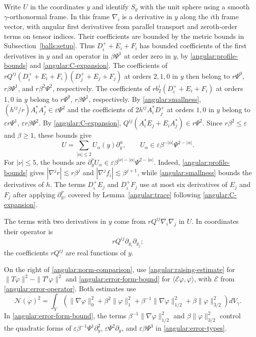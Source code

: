 \documentclass[11pt,a4paper]{article}
\theoremstyle{definition}
\theoremstyle{remark}
\newcommand{\eps}{\varepsilon}
\numberwithin{equation}{section}
\begin{document}
Write $U$ in the coordinates $y$ and identify $S_y$ with the unit
sphere using a smooth $\gamma$-orthonormal frame. In this frame
$\nabla_i$ is a derivative in $y$ along the $i$th frame vector,
with angular first derivatives from parallel transport and
zeroth-order terms on tensor indices. Their coefficients are
bounded by the metric bounds in Subsection~\ref{balls:setup}. Thus $D_i^++E_i+F_i$ has
bounded coefficients of the first derivatives in $y$ and an
operator in $\beta\Psi^1$ at order zero in $y$, by
\eqref{angular:profile-bounds} and \eqref{angular:C-expansion}.
The coefficients of $rQ^{ij}(D_i^++E_i+F_i)(D_j^++E_j+F_j)$
at orders $2,1,0$ in $y$ then belong to
$r\Psi^0$, $r\beta\Psi^1$, and $r\beta^2\Psi^2$, respectively.
The coefficients of $r b_2^i(D_i^++E_i+F_i)$ at orders $1,0$
in $y$ belong to $r\Psi^0$, $r\beta\Psi^1$, respectively.
By \eqref{angular:smallness},
$(h^{ij}/r)A_i^*A_j^*\in\eps\Psi^2$ and the coefficients of
$2h^{ij}A_i^*D_j^+$ at orders $1,0$ in $y$ belong to
$\eps r\Psi^1$, $\eps r\beta\Psi^2$. By \eqref{angular:C-expansion},
$Q^{ij}(A_i^*E_j+E_iA_j^*)\in r\Psi^2$.
Since $r\beta^2\le\eps$ and $\beta\ge1$, these bounds give
\begin{equation}\label{angular:U-bounds}
 U=\sum_{|\alpha|\le2}U_\alpha(y)\partial_y^\alpha,
 \qquad U_\alpha\in\eps\beta^{-|\alpha|}
                               \Psi^{2-|\alpha|}.
\end{equation}
For $|\nu|\le5$, the bounds are
$\partial_y^\nu U_\alpha\in
\eps\beta^{|\nu|-|\alpha|}\Psi^{2-|\alpha|}$.
Indeed, \eqref{angular:profile-bounds} gives
$|\nabla^j r|\lesssim r\beta^j$ and
$|\nabla^j f_i|\lesssim\beta^{j+1}$, while
\eqref{angular:smallness} bounds the derivatives of $h$.
The terms $D_i^+E_j$ and $D_i^+F_j$ use at most six derivatives of
$E_j$ and $F_j$ after applying $\partial_y^\nu$, covered by
Lemma~\ref{angular:trace} following \eqref{angular:C-expansion}.

The terms with two derivatives in $y$ come from
$rQ^{ij}\nabla_i\nabla_j$ in $U$. In coordinates their operator is
\begin{equation}\label{angular:real-principal-part}
 rQ^{ij}\partial_{y_i}\partial_{y_j};
\end{equation}
the coefficients $rQ^{ij}$ are real functions of $y$.

On the right of \eqref{angular:norm-comparison}, use
\eqref{angular:raising-estimate} for $\|T\varphi\|^2-\|T^\flat\varphi\|^2$
and \eqref{angular:error-form-bound} for $\langle\mathcal E\varphi,\varphi\rangle$,
with $\mathcal E$ from \eqref{angular:error-operator}. Both estimates use
\begin{equation}\label{angular:N-definition}
 \mathcal N(\varphi)^2
 =\int_Y\left(
  \|\nabla\varphi\|_0^2+\beta^2\|\varphi\|_1^2
  +\beta^{-1}\|\nabla\varphi\|_{1/2}^2
  +\beta\|\varphi\|_{3/2}^2\right)dV_\gamma.
\end{equation}
In \eqref{angular:error-form-bound}, the terms
$\beta^{-1}\|\nabla\varphi\|_{1/2}^2$ and
$\beta\|\varphi\|_{3/2}^2$ control the quadratic forms of
$\eps\beta^{-1}\Psi^1\partial_y^2$, $\eps\Psi^2\partial_y$, and
$\eps\beta\Psi^3$ in \eqref{angular:error-types}.
\end{document}
